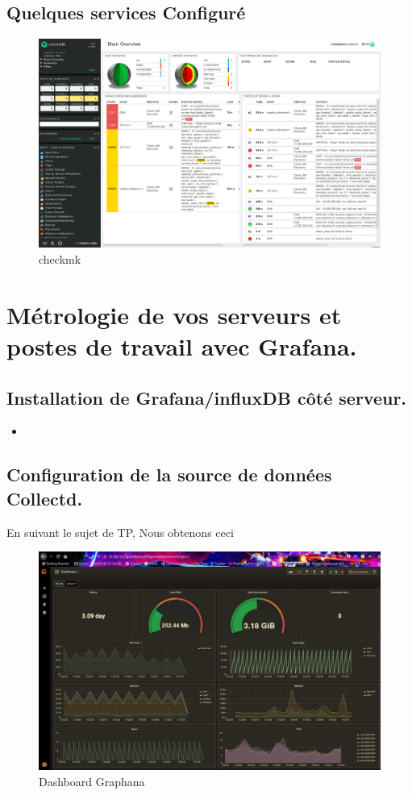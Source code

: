 \documentclass[10pt,a4paper]{article}
\newcommand{\insertcode}[2]{\begin{itemize}\item[]\end{itemize}}
\begin{document}
\subsection{Quelques services Configuré}

  \begin{figure}[h!]
\centering
\includegraphics[scale=0.30]{screen/checkmk2.png}
\caption{checkmk}
\label{fig:qos}
\end{figure}



\newpage
\section{Métrologie de vos serveurs et postes de travail avec Grafana.}
\subsection{Installation de Grafana/influxDB côté serveur.}
\insertcode{commande/10.txt}{Installation/Utilisation de Docker}


\subsection{ Configuration de la source de données Collectd.}

En suivant le sujet de TP, 
Nous obtenons ceci 
  \begin{figure}[h!]
\centering
\includegraphics[scale=0.30]{screen/collectd.jpg}
\caption{Dashboard Graphana }
\label{fig:qos}
\end{figure}
\end{document}
